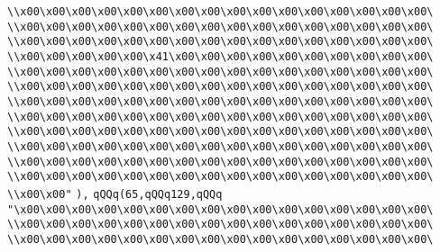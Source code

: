 \verb|\\x00\x00\x00\x00\x00\x00\x00\x00\x00\x00\x00\x00\x00\x00\x00\x00\|\newline
\verb|\\x00\x00\x00\x00\x00\x00\x00\x00\x00\x00\x00\x00\x00\x00\x00\x00\|\newline
\verb|\\x00\x00\x00\x00\x00\x00\x00\x00\x00\x00\x00\x00\x00\x00\x00\x00\|\newline
\verb|\\x00\x00\x00\x00\x00\x41\x00\x00\x00\x00\x00\x00\x00\x00\x00\x00\|\newline
\verb|\\x00\x00\x00\x00\x00\x00\x00\x00\x00\x00\x00\x00\x00\x00\x00\x00\|\newline
\verb|\\x00\x00\x00\x00\x00\x00\x00\x00\x00\x00\x00\x00\x00\x00\x00\x00\|\newline
\verb|\\x00\x00\x00\x00\x00\x00\x00\x00\x00\x00\x00\x00\x00\x00\x00\x00\|\newline
\verb|\\x00\x00\x00\x00\x00\x00\x00\x00\x00\x00\x00\x00\x00\x00\x00\x00\|\newline
\verb|\\x00\x00\x00\x00\x00\x00\x00\x00\x00\x00\x00\x00\x00\x00\x00\x00\|\newline
\verb|\\x00\x00\x00\x00\x00\x00\x00\x00\x00\x00\x00\x00\x00\x00\x00\x00\|\newline
\verb|\\x00\x00\x00\x00\x00\x00\x00\x00\x00\x00\x00\x00\x00\x00\x00\x00\|\newline
\verb|\\x00\x00\x00\x00\x00\x00\x00\x00\x00\x00\x00\x00\x00\x00\x00\x00\|\newline
\verb|\\x00\x00"|\newline
\verb|),|\newline
\verb|qQQq(65,qQQq129,qQQq|\newline
\verb|"\x00\x00\x00\x00\x00\x00\x00\x00\x00\x00\x00\x00\x00\x00\x00\x00\|\newline
\verb|\\x00\x00\x00\x00\x00\x00\x00\x00\x00\x00\x00\x00\x00\x00\x00\x00\|\newline
\verb|\\x00\x00\x00\x00\x00\x00\x00\x00\x00\x00\x00\x00\x00\x00\x00\x00\|\newline
